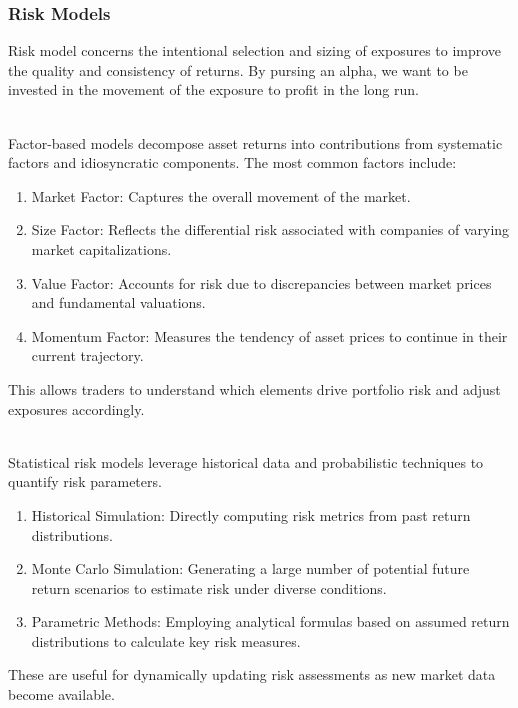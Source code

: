 \subsubsection{Risk Models}

Risk model concerns the intentional selection and sizing of exposures to improve the quality and consistency of returns. By pursing an alpha, we want to be invested in the movement of the exposure to profit in the long run.

\begin{method} \\
Factor-based models decompose asset returns into contributions from systematic factors and idiosyncratic components. The most common factors include:
\begin{enumerate}[label=\roman*.]
\setlength{\itemsep}{0pt}
\item Market Factor: Captures the overall movement of the market.
\item Size Factor: Reflects the differential risk associated with companies of varying market capitalizations.
\item Value Factor: Accounts for risk due to discrepancies between market prices and fundamental valuations.
\item Momentum Factor: Measures the tendency of asset prices to continue in their current trajectory.
\end{enumerate}
This allows traders to understand which elements drive portfolio risk and adjust exposures accordingly.
\end{method}

\begin{method} \\
Statistical risk models leverage historical data and probabilistic techniques to quantify risk parameters.
\begin{enumerate}[label=\roman*.]
\setlength{\itemsep}{0pt}
\item Historical Simulation: Directly computing risk metrics from past return distributions.
\item Monte Carlo Simulation: Generating a large number of potential future return scenarios to estimate risk under diverse conditions.
\item Parametric Methods: Employing analytical formulas based on assumed return distributions to calculate key risk measures.
\end{enumerate}
These are useful for dynamically updating risk assessments as new market data become available.
\end{method}

